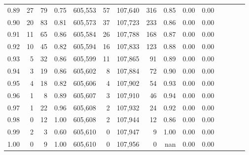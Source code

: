 \begin{tabular}{rrrcrrrrrrrrrrr}
0.89 &      27 &     79 &                                       0.75 &  605,553 &       57 &  107,640 &      316 &  0.85 &  0.00 &                         0.00 \\
0.90 &      20 &     83 &                                       0.81 &  605,573 &       37 &  107,723 &      233 &  0.86 &  0.00 &                         0.00 \\
0.91 &      11 &     65 &                                       0.86 &  605,584 &       26 &  107,788 &      168 &  0.87 &  0.00 &                         0.00 \\
0.92 &      10 &     45 &                                       0.82 &  605,594 &       16 &  107,833 &      123 &  0.88 &  0.00 &                         0.00 \\
0.93 &       5 &     32 &                                       0.86 &  605,599 &       11 &  107,865 &       91 &  0.89 &  0.00 &                         0.00 \\
0.94 &       3 &     19 &                                       0.86 &  605,602 &        8 &  107,884 &       72 &  0.90 &  0.00 &                         0.00 \\
0.95 &       4 &     18 &                                       0.82 &  605,606 &        4 &  107,902 &       54 &  0.93 &  0.00 &                         0.00 \\
0.96 &       1 &      8 &                                       0.89 &  605,607 &        3 &  107,910 &       46 &  0.94 &  0.00 &                         0.00 \\
0.97 &       1 &     22 &                                       0.96 &  605,608 &        2 &  107,932 &       24 &  0.92 &  0.00 &                         0.00 \\
0.98 &       0 &     12 &                                       1.00 &  605,608 &        2 &  107,944 &       12 &  0.86 &  0.00 &                         0.00 \\
0.99 &       2 &      3 &                                       0.60 &  605,610 &        0 &  107,947 &        9 &  1.00 &  0.00 &                         0.00 \\
1.00 &       0 &      9 &                                       1.00 &  605,610 &        0 &  107,956 &        0 &   nan &  0.00 &                         0.00 \\
\bottomrule
\end{tabular}
